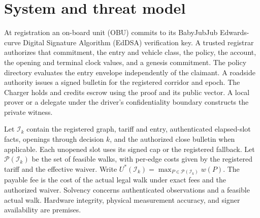 \section{System and threat model}
\label{sec:model}



At registration an on-board unit (OBU) commits to its BabyJubJub Edwards-curve Digital Signature Algorithm (EdDSA) verification key. A trusted registrar authorizes that commitment, the entry and vehicle class, the policy, the account, the opening and terminal clock values, and a genesis commitment. The policy directory evaluates the entry envelope independently of the claimant. A roadside authority issues a signed bulletin for the registered corridor and epoch. The Charger holds and credits escrow using the proof and its public vector. A local prover or a delegate under the driver's confidentiality boundary constructs the private witness.

Let $\mathcal I_k$ contain the registered graph, tariff and entry, authenticated elapsed-slot facts, openings through decision $k$, and the authorized close bulletin when applicable. Each unopened slot uses its signed cap or the registered fallback. Let $\mathcal P(\mathcal I_k)$ be the set of feasible walks, with per-edge costs given by the registered tariff and the effective waiver. Write $U^*(\mathcal I_k)=\max_{P\in\mathcal P(\mathcal I_k)}w(P)$. The payable fee is the cost of the actual legal walk under exact fees and the authorized waiver. Solvency concerns authenticated observations and a feasible actual walk. Hardware integrity, physical measurement accuracy, and signer availability are premises.


